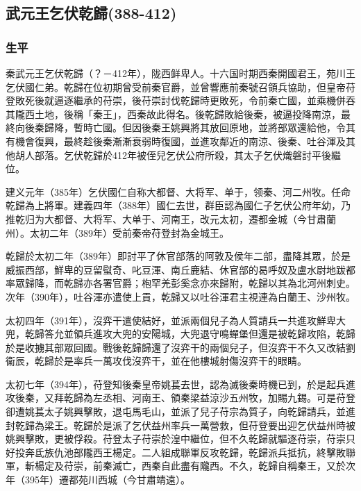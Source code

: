 
\subsection{武元王乞伏乾歸\tiny(388-412)}

\subsubsection{生平}

秦武元王乞伏乾歸（？－412年），陇西鲜卑人。十六国时期西秦開國君王，苑川王乞伏國仁弟。乾歸在位初期曾受前秦官爵，並曾響應前秦號召領兵協助，但皇帝苻登敗死後就逼逐繼承的苻崇，後苻崇討伐乾歸時更敗死，令前秦亡國，並乘機併吞其隴西土地，後稱「秦王」，西秦故此得名。後乾歸敗給後秦，被逼投降南涼，最終向後秦歸降，暫時亡國。但因後秦王姚興將其放回原地，並將部眾還給他，令其有機會復興，最終趁後秦漸漸衰弱時復國，並進攻鄰近的南涼、後秦、吐谷渾及其他胡人部落。乞伏乾歸於412年被侄兒乞伏公府所殺，其太子乞伏熾磐討平後繼位。

建义元年（385年）乞伏國仁自称大都督、大将军、单于，领秦、河二州牧。任命乾歸為上將軍。建義四年（388年）國仁去世，群臣認為國仁子乞伏公府年幼，乃推乾归为大都督、大将军、大单于、河南王，改元太初，遷都金城（今甘肅蘭州）。太初二年（389年）受前秦帝苻登封為金城王。

乾歸於太初二年（389年）即討平了休官部落的阿敦及侯年二部，盡降其眾，於是威振西部，鮮卑的豆留螱奇、叱豆渾、南丘鹿結、休官部的曷呼奴及盧水尉地跋都率眾歸降，而乾歸亦各署官爵；枹罕羌彭奚念亦來歸附，乾歸以其為北河州刺史。次年（390年），吐谷渾亦遣使上貢，乾歸又以吐谷渾君主視連為白蘭王、沙州牧。

太初四年（391年），沒弈干遣使結好，並派兩個兒子為人質請兵一共進攻鮮卑大兜，乾歸答允並領兵進攻大兜的安陽城，大兜退守鳴蟬堡但還是被乾歸攻陷，乾歸於是收擄其部眾回國。戰後乾歸歸還了沒弈干的兩個兒子，但沒弈干不久又改結劉衞辰，乾歸於是率兵一萬攻伐沒弈干，並在他樓城射傷沒弈干的眼睛。

太初七年（394年），苻登知後秦皇帝姚萇去世，認為滅後秦時機已到，於是起兵進攻後秦，又拜乾歸為左丞相、河南王、領秦梁益涼沙五州牧，加賜九錫。可是苻登卻遭姚萇太子姚興擊敗，退屯馬毛山，並派了兒子苻宗為質子，向乾歸請兵，並進封乾歸為梁王。乾歸於是派了乞伏益州率兵一萬營救，但苻登要出迎乞伏益州時被姚興擊敗，更被俘殺。苻登太子苻崇於湟中繼位，但不久乾歸就驅逐苻崇，苻崇只好投奔氐族仇池部隴西王楊定。二人組成聯軍反攻乾歸，乾歸派兵抵抗，終擊敗聯軍，斬楊定及苻崇，前秦滅亡，西秦自此盡有隴西。不久，乾歸自稱秦王，又於次年（395年）遷都苑川西城（今甘肅靖遠）。

